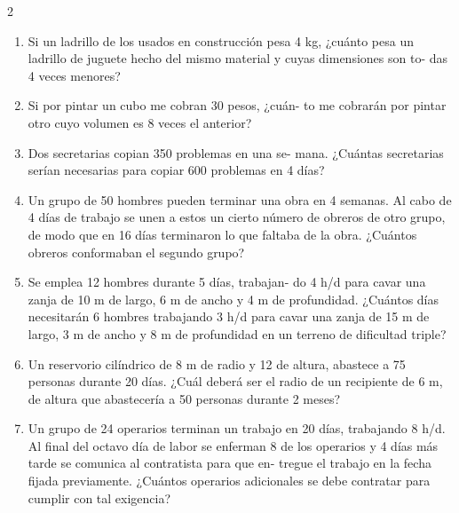 \documentclass[10pt]{article}
\begin{document}
\begin{multicols}{2}
\begin{enumerate}[label=\textbf{\arabic*.}]
			\item Si un ladrillo de los usados en construcción pesa
			4 kg, ¿cuánto pesa un ladrillo de juguete hecho
			del mismo material y cuyas dimensiones son to-
			das 4 veces menores?
			\vspace{0.4cm}

			\item Si por pintar un cubo me cobran 30 pesos, ¿cuán-
			to me cobrarán por pintar otro cuyo volumen es 8
			veces el anterior?
			\vspace{0.4cm}


			\item Dos secretarias copian 350 problemas en una se-
			mana. ¿Cuántas secretarias serían necesarias para
			copiar 600 problemas en 4 días?
			\vspace{0.4cm}


			\item Un grupo de 50 hombres pueden terminar una
			obra en 4 semanas. Al cabo de 4 días de trabajo se
			unen a estos un cierto número de obreros de otro
			grupo, de modo que en 16 días terminaron lo que
			faltaba de la obra. ¿Cuántos obreros conformaban
			el segundo grupo?
			\vspace{0.4cm}

			\item Se emplea 12 hombres durante 5 días, trabajan-
			do 4 h/d para cavar una zanja de 10 m de largo,
			6 m de ancho y 4 m de profundidad. ¿Cuántos
			días necesitarán 6 hombres trabajando 3 h/d para
			cavar una zanja de 15 m de largo, 3 m de ancho
			y 8 m de profundidad en un terreno de dificultad
			triple?
			\vspace{0.4cm}

			\item Un reservorio cilíndrico de 8 m de radio y 12 de
			altura, abastece a 75 personas durante 20 días.
			¿Cuál deberá ser el radio de un recipiente de 6 m,
			de altura que abastecería a 50 personas durante 2
			meses?
			\vspace{0.4cm}

			\item Un grupo de 24 operarios terminan un trabajo en
			20 días, trabajando 8 h/d. Al final del octavo día
			de labor se enferman 8 de los operarios y 4 días
			más tarde se comunica al contratista para que en-
			tregue el trabajo en la fecha fijada previamente.
			¿Cuántos operarios adicionales se debe contratar
			para cumplir con tal exigencia?
			\vspace{0.4cm}

		\end{enumerate}

	\end{multicols}
\end{document}
